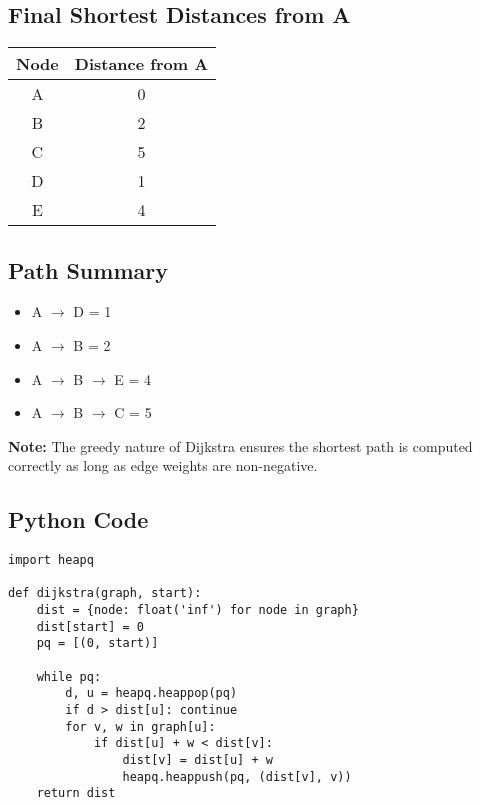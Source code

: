 \documentclass[a4paper,14pt]{extarticle}
\begin{document}
\subsection*{Final Shortest Distances from A}
\begin{center}
\begin{tabular}{|c|c|}
\hline
\textbf{Node} & \textbf{Distance from A} \\
\hline
A & 0 \\
B & 2 \\
C & 5 \\
D & 1 \\
E & 4 \\
\hline
\end{tabular}
\end{center}

\subsection*{Path Summary}
\begin{itemize}
    \item A $\rightarrow$ D = 1
    \item A $\rightarrow$ B = 2
    \item A $\rightarrow$ B $\rightarrow$ E = 4
    \item A $\rightarrow$ B $\rightarrow$ C = 5
\end{itemize}

\textbf{Note:} The greedy nature of Dijkstra ensures the shortest path is computed correctly as long as edge weights are non-negative.



\newpage
\subsection*{Python Code}
\begin{lstlisting}[style=python, caption={Dijkstra’s Algorithm in Python}]
import heapq

def dijkstra(graph, start):
    dist = {node: float('inf') for node in graph}
    dist[start] = 0
    pq = [(0, start)]

    while pq:
        d, u = heapq.heappop(pq)
        if d > dist[u]: continue
        for v, w in graph[u]:
            if dist[u] + w < dist[v]:
                dist[v] = dist[u] + w
                heapq.heappush(pq, (dist[v], v))
    return dist
\end{lstlisting}
\end{document}

